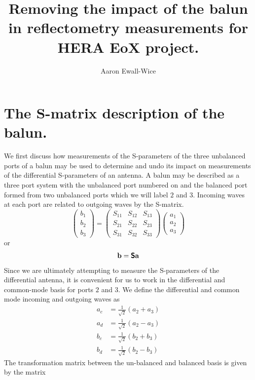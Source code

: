 \documentclass[preprint]{aastex}
\title{Removing the impact of the balun in reflectometry measurements for HERA EoX project.}
\author{Aaron Ewall-Wice}
\begin{document}
\maketitle
\section{The S-matrix description of the balun.}
We first discuss how measurements of the S-parameters of the three unbalanced ports of a balun may be used to determine and undo its impact on measurements of the differential S-parameters of an antenna. A balun may be described as a three port system with the unbalanced port numbered on and the balanced port formed from two unbalanced ports which we will label $2$ and $3$. Incoming waves at each port are related to outgoing waves by the S-matrix.
\begin{equation}\label{eq:SMatrix}
\begin{pmatrix} b_1 \\ b_2 \\ b_3 \end{pmatrix} = \begin{pmatrix} S_{11} & S_{12} & S_{13} \\
				S_{21} & S_{22} & S_{23} \\
				S_{31} & S_{32} & S_{33} \end{pmatrix} \begin{pmatrix} a_1 \\ a_2 \\ a_3 \end{pmatrix}
\end{equation}
or
\begin{equation}
{\bf b} = \boldsymbol{\mathsf{S}} {\bf a}
\end{equation}
Since we are ultimately attempting to measure the S-parameters of the differential antenna, it is convenient for us to work in the differential and common-mode basis for ports $2$ and $3$.  We define the differential and common mode incoming and outgoing waves as 
\begin{align}
a_c &= \frac{1}{\sqrt{2}} \left(a_2 + a_3\right)\\
a_d &=\frac{1}{\sqrt{2}} \left(a_2 - a_3 \right) \\
b_c &= \frac{1}{\sqrt{2}} \left(b_2 + b_3 \right)\\
b_d &= \frac{1}{\sqrt{2}} \left(b_2 - b_3 \right)
\end{align}
The transformation matrix between the un-balanced and balanced basis is given by the matrix
\end{document}
